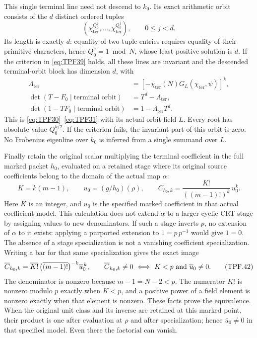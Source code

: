 This single terminal line need not descend to
\(k_0\). Its exact arithmetic orbit consists of
the \(d\) distinct ordered tuples
\[
 \left(\chi_{\mathrm{ter}}^{Q_0^j},\ldots,
             \chi_{\mathrm{ter}}^{Q_0^j}\right),
             \qquad 0\le j<d.
\]
Its length is exactly \(d\): equality of two
tuple entries requires equality of their primitive
characters, hence \(Q_0^e=1\bmod N\), whose least
positive solution is \(d\).
If the criterion in \eqref{eq:TPF39} holds, all
these lines are invariant and the descended
terminal-orbit block has dimension \(d\), with
\[
 \begin{split}
 \Lambda_{\mathrm{ter}}
   &=\left[-\chi_{\mathrm{ter}}(N)
                    G_L(\chi_{\mathrm{ter}},\psi)\right]^k,\\
 \det(T-F_0\mid\text{terminal orbit})
   &=T^d-\Lambda_{\mathrm{ter}},\\
 \det(1-TF_0\mid\text{terminal orbit})
   &=1-\Lambda_{\mathrm{ter}}T^d .
 \end{split}
 \tag{TPF.40}\label{eq:TPF40}
\]
This is \eqref{eq:TPF30}--\eqref{eq:TPF31} with
its actual orbit field \(L\). Every root has
absolute value \(Q_0^{k/2}\).
If the criterion fails, the invariant part of
this orbit is zero. No Frobenius eigenline over
\(k_0\) is inferred from a single summand over \(L\).

Finally retain the original scalar multiplying
the terminal coefficient in the full marked
packet \(h_0\), evaluated on a retained stage
where its original source coefficients belong
to the domain of the actual map \(\alpha\):
\[
 K=k(m-1),\qquad
 u_0=(g/h_0)(\rho),\qquad
 C_{h_0,k}=
        \frac{K!}{((m-1)!)^k}\,u_0^k .
 \tag{TPF.41}\label{eq:TPF41}
\]
Here \(K\) is an integer, and \(u_0\) is the
specified marked coefficient in that actual
coefficient model. This calculation does not
extend \(\alpha\) to a larger cyclic CRT stage
by assigning values to new denominators.
If such a stage inverts \(p\), no extension
of \(\alpha\) to it exists: applying a purported
extension to \(1=p\,p^{-1}\) would give \(1=0\).
The absence of a stage specialization is not
a vanishing coefficient specialization.
Writing a bar for that same specialization gives
the exact image
\[
 \overline{C}_{h_0,k}
  =\overline{K!}\,
       \bigl(\overline{(m-1)!}\bigr)^{-k}
                           \overline u_0^{\,k},\qquad
 \overline C_{h_0,k}\ne0
    \ \Longleftrightarrow\
           K<p\ \hbox{and }\overline u_0\ne0 .
 \tag{TPF.42}\label{eq:TPF42}
\]
The denominator is nonzero because \(m-1=N-2<p\).
The numerator \(K!\) is nonzero modulo \(p\)
exactly when \(K<p\), and a positive power of a
field element is nonzero exactly when that
element is nonzero. These facts prove the
equivalence. When the original unit class and
its inverse are retained at this marked point,
their product is one after evaluation at
\(\rho\) and after specialization; hence
\(\overline u_0\ne0\) in that specified model.
Even there the factorial can vanish.

